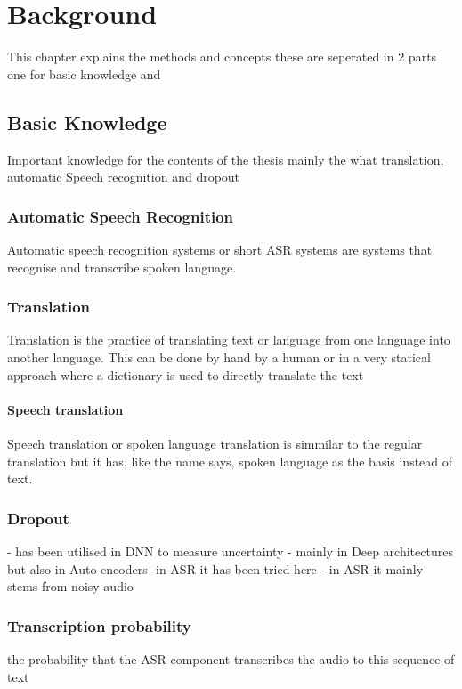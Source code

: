 \chapter{Background}
This chapter explains the methods and concepts these are seperated in 2 parts one for basic knowledge and 

\section{Basic Knowledge}
Important knowledge for the contents of the thesis mainly the what translation, automatic Speech recognition and dropout


\subsection{Automatic Speech Recognition}
Automatic speech recognition systems or short ASR systems are systems that recognise and transcribe spoken language. 

\subsection{Translation}
Translation is the practice of translating text or language from one language into another language. This can be done by hand by a human or in a very statical approach where a dictionary is used to directly translate the text 
\subsubsection{Speech translation}
Speech translation or spoken language translation is simmilar to the regular translation but it has, like the name says, spoken language as the basis instead of text. 


\subsection{Dropout}
- has been utilised in DNN to measure uncertainty
- mainly in Deep architectures but also in Auto-encoders \cite{}
-in ASR it has been tried here  \cite{8683086}
- in ASR it mainly stems from noisy audio 


\subsection{Transcription probability}
the probability that the ASR component transcribes the audio to this sequence of text


